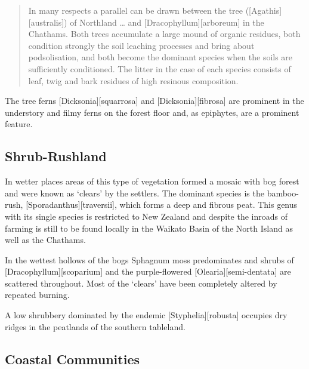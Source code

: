 \begin{quote}
	In many respects a parallel can be drawn between the  tree ([Agathis][australis]) of Northland … and [Dracophyllum][arboreum] in the Chathams.
	Both trees accumulate a large mound of organic residues, both condition strongly the soil leaching processes and bring about podsolisation, and both become the dominant species when the soils are sufficiently conditioned.
	The litter in the case of each species consists of leaf, twig and bark residues of high resinous composition.
\end{quote}

The tree ferns [Dicksonia][squarrosa] and [Dicksonia][fibrosa] are prominent in the understory and filmy ferns on the forest floor and, as epiphytes, are a prominent feature.

\subsection{Shrub-Rushland}

In wetter places areas of this type of vegetation formed a mosaic with bog forest and were known as `clears' by the settlers.
The dominant species is the bamboo-rush, [Sporadanthus][traversii], which forms a deep and fibrous peat.
This genus with its single species is restricted to New Zealand and despite the inroads of farming is still to be found locally in the Waikato Basin of the North Island as well as the Chathams.

In the wettest hollows of the bogs Sphagnum moss predominates and shrubs of [Dracophyllum][scoparium] and the purple-flowered [Olearia][semi-dentata] are scattered throughout.
Most of the `clears' have been completely altered by repeated burning.

A low shrubbery dominated by the endemic [Styphelia][robusta] occupies dry ridges in the peatlands of the southern tableland.

\subsection{Coastal Communities}

